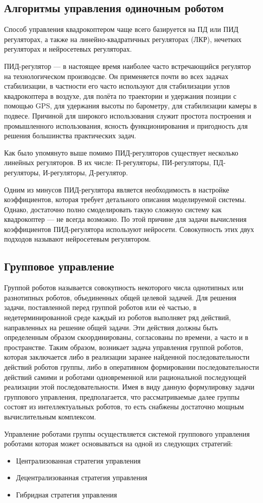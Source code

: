 \documentclass[a4paper, 14pt]{extarticle}
\let\Oldsubsection\subsection
\renewcommand{\subsection}{\FloatBarrier\Oldsubsection}
\begin{document}
\subsection{Алгоритмы управления одиночным роботом}
Способ управления квадрокоптером чаще всего базируется на ПД или ПИД регуляторах, а также на линейно-квадратичных
регуляторах (ЛКР), нечетких регуляторах и нейросетевых регуляторах.
\par
ПИД-регулятор — в настоящее время наиболее часто встречающийся регулятор на технологическом производсве. Он применяется почти во всех задачах стабилизации, в частности его часто используют для стабилизации углов квадрокоптера в воздухе, для полёта по траектории и удержания позиции с помощью GPS, для удержания высоты по барометру, для стабилизации камеры в подвесе. Причиной для широкого использования служит простота построения и промышленного использования, ясность функционирования и пригодность для решения большинства практических задач.
\par
Как было упомянуто выше помимо ПИД-регуляторов существует несколько линейных регуляторов. В их числе: П-регуляторы, ПИ-регуляторы, ПД-регуляторы, И-регуляторы, Д-регулятор.
\par
Одним из минусов ПИД-регулятора является необходимость в настройке коэффициентов, которая требует  детального описания моделируемой системы. Однако, достаточно полно смоделировать такую сложную систему как квадрокоптер — не всегда возможно. По этой причине для задачи вычисления коэффициентов ПИД-регулятора используют нейросети. Совокупность этих двух подходов называют нейросетевым регулятором. \par
\subsection{Групповое управление}
Группой роботов называется совокупность
некоторого числа однотипных или разнотипных роботов, объединенных
общей целевой задачей. Для решения задачи, поставленной перед группой роботов или еѐ
частью, в недетерминированной среде каждый из роботов выполняет ряд
действий, направленных на решение общей задачи. Эти действия 
должны быть определенным образом скоординированы, согласованы по
времени, а часто и в пространстве. Таким образом, возникает задача
управления группой роботов, которая заключается либо в реализации
заранее найденной последовательности действий роботов группы, либо в
оперативном
формировании
последовательности
действий
самими
и
роботами
одновременной
или
рациональной
последующей
реализации этой последовательности. Имея в виду данную формулировку задачи группового управления,
предполагается,
что
рассматриваемые
далее
группы
состоят
из интеллектуальных роботов, то есть снабжены достаточно мощным вычислительным комплексом.
\par
Управление роботами группы осуществляется системой группового
управления роботами которая может основываться на одной из следующих стратегий:
\begin{itemize}
	\item Централизованная стратегия управления
	\item Децентрализованная стратегия управления
	\item Гибридная стратегия управления
\end{itemize}
\end{document}
